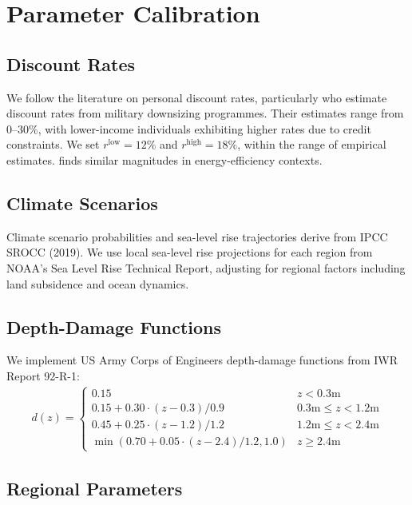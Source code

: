 \documentclass[11pt,letterpaper]{article}
\theoremstyle{definition}
\begin{document}
\section{Parameter Calibration}

\subsection{Discount Rates}

We follow the literature on personal discount rates, particularly \citet{warner2001personal} who estimate discount rates from military downsizing programmes. Their estimates range from 0--30\%, with lower-income individuals exhibiting higher rates due to credit constraints. We set $r^{\text{low}} = 12\%$ and $r^{\text{high}} = 18\%$, within the range of empirical estimates. \citet{hausman1979individual} finds similar magnitudes in energy-efficiency contexts.

\subsection{Climate Scenarios}

Climate scenario probabilities and sea-level rise trajectories derive from IPCC SROCC (2019). We use local sea-level rise projections for each region from NOAA's Sea Level Rise Technical Report, adjusting for regional factors including land subsidence and ocean dynamics.

\subsection{Depth-Damage Functions}

We implement US Army Corps of Engineers depth-damage functions from IWR Report 92-R-1:
\begin{align}
d(z) = \begin{cases}
0.15 & z < 0.3\text{m} \\
0.15 + 0.30 \cdot (z - 0.3)/0.9 & 0.3\text{m} \leq z < 1.2\text{m} \\
0.45 + 0.25 \cdot (z - 1.2)/1.2 & 1.2\text{m} \leq z < 2.4\text{m} \\
\min(0.70 + 0.05 \cdot (z - 2.4)/1.2, 1.0) & z \geq 2.4\text{m}
\end{cases}
\end{align}

\subsection{Regional Parameters}
\end{document}
